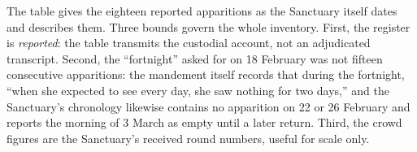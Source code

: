 The table gives the eighteen reported apparitions as the Sanctuary
itself dates and describes them. Three bounds govern the whole
inventory. First, the register is \emph{reported}: the table
transmits the custodial account, not an adjudicated transcript.
Second, the ``fortnight'' asked for on 18 February was not fifteen
consecutive apparitions: the mandement itself records that during
the fortnight, ``when she expected to see every day, she saw
nothing for two days,'' and the Sanctuary's chronology likewise
contains no apparition on 22 or 26 February and reports the morning
of 3 March as empty until a later return. Third, the crowd figures are the Sanctuary's received
round numbers, useful for scale only.

